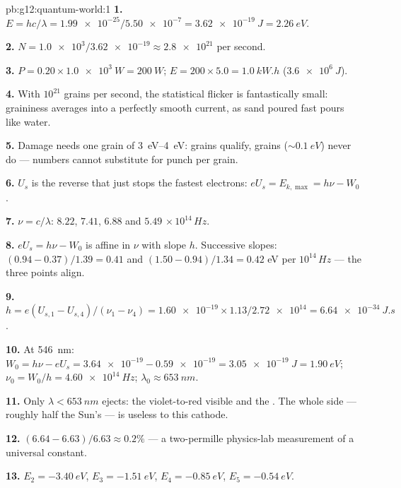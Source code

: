 \begin{solution}{pb:g12:quantum-world:1}
\textbf{1.} $E = hc/\lambda = \num{1.99e-25}/\num{5.50e-7} =
\qty{3.62e-19}{J} = \qty{2.26}{eV}$.

\textbf{2.} $N = \num{1.0e3}/\num{3.62e-19} \approx \num{2.8e21}$
 per second.

\textbf{3.} $P = 0.20 \times \qty{1.0e3}{W} = \qty{200}{W}$;
$E = 200 \times 5.0 = \qty{1.0}{kW.h}$ ($\qty{3.6e6}{J}$).

\textbf{4.} With $10^{21}$ grains per second, the statistical
flicker is fantastically small: graininess averages into a perfectly
smooth current, as sand poured fast pours like water.

\textbf{5.} Damage needs one grain of \qtyrange{3}{4}{eV}: 
grains qualify,  grains ($\sim \qty{0.1}{eV}$) never do ---
numbers cannot substitute for punch per grain.

\textbf{6.} $U_s$ is the reverse  that just stops the fastest
electrons: $eU_s = E_{k,\max} = h\nu - W_0$.

\textbf{7.} $\nu = c/\lambda$: $8.22$, $7.41$, $6.88$ and $5.49$
$\times\,10^{14}\,\unit{Hz}$.

\textbf{8.} $eU_s = h\nu - W_0$ is affine in $\nu$ with slope $h$.
Successive slopes: $(0.94 - 0.37)/1.39 = 0.41$ and
$(1.50 - 0.94)/1.34 = 0.42$ \unit{eV} per $10^{14}\,\unit{Hz}$ ---
the three points align.

\textbf{9.} $h = e(U_{s,1}-U_{s,4})/(\nu_1-\nu_4) = \num{1.60e-19}
\times 1.13/\num{2.72e14} = \qty{6.64e-34}{J.s}$.

\textbf{10.} At \qty{546}{nm}: $W_0 = h\nu - eU_s = \num{3.64e-19} -
\num{0.59e-19} = \qty{3.05e-19}{J} = \qty{1.90}{eV}$;
$\nu_0 = W_0/h = \qty{4.60e14}{Hz}$; $\lambda_0 \approx \qty{653}{nm}$.

\textbf{11.} Only $\lambda < \qty{653}{nm}$ ejects: the violet-to-red
visible and the . The whole  side --- roughly half
the Sun's  --- is useless to this cathode.

\textbf{12.} $(6.64 - 6.63)/6.63 \approx 0.2\%$ --- a two-permille
physics-lab measurement of a universal constant.

\textbf{13.} $E_2 = \qty{-3.40}{eV}$, $E_3 = \qty{-1.51}{eV}$,
$E_4 = \qty{-0.85}{eV}$, $E_5 = \qty{-0.54}{eV}$.


\end{solution}
